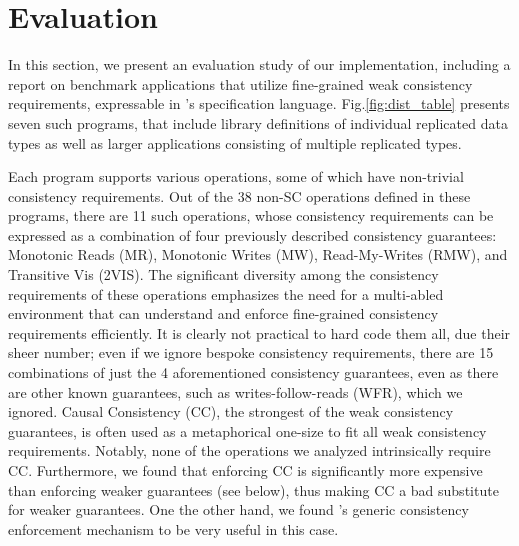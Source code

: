 \newpage
\section{Evaluation}
\label{sec:eval}
%

In this section, we present an evaluation study of our implementation,
including a report on
benchmark applications that utilize fine-grained weak consistency
requirements, expressable
in \tool's specification language.
Fig.\ref{fig:dist_table} presents seven such programs, that include
library definitions of individual replicated data types as well as
larger applications consisting of multiple replicated types. 

Each program supports various operations, some of which have
non-trivial consistency requirements. Out of the 38 non-SC operations
defined in these programs, there are 11 such operations, whose
consistency requirements can be expressed as a combination of four
previously described consistency guarantees: Monotonic Reads (MR),
Monotonic Writes (MW), Read-My-Writes (RMW), and Transitive Vis
(2VIS). The significant diversity among the consistency requirements
of these operations emphasizes the need for a multi-abled environment
that can understand and enforce fine-grained consistency requirements
efficiently. It is clearly not practical to hard code them all, due
their sheer number; even if we ignore bespoke consistency
requirements, there are 15 combinations of just the 4 aforementioned
consistency guarantees, even as there are other known guarantees, such
as writes-follow-reads (WFR), which we ignored.  Causal Consistency
(CC), the strongest of the weak consistency guarantees, is often used
as a metaphorical one-size to fit all weak consistency requirements.
Notably, none of the operations we analyzed intrinsically require CC.
Furthermore, we found that enforcing CC is significantly more
expensive than enforcing weaker guarantees (see below), thus making CC
a bad substitute for weaker guarantees. One the other hand, we found
\tool's generic consistency enforcement mechanism to be very useful in
this case.

